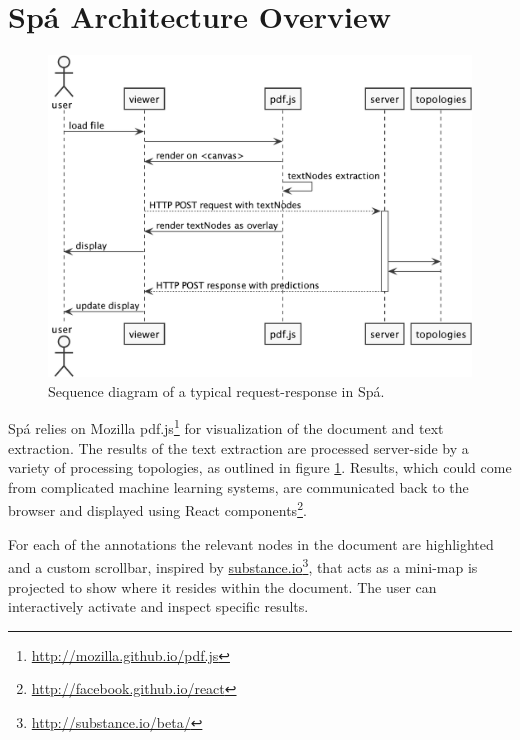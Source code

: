 \documentclass[runningheads,a4paper]{llncs}
\begin{document}
\section{Spá Architecture Overview}
\label{section:architecture}
 \vspace{-1em}
\begin{figure}
\begin{center}
\includegraphics[scale=.275]{./diagrams/sequence.pdf}
\end{center}
\caption{\label{fig:sequence}Sequence diagram of a typical request-response in Spá.}
\vspace{-2em}
\end{figure}

Spá relies on Mozilla pdf.js\footnote{\url{http://mozilla.github.io/pdf.js}} for visualization of the document and text extraction.
The results of the text extraction are processed server-side by a variety of processing topologies, as outlined in figure \ref{fig:sequence}.
Results, which could come from complicated machine learning systems, are communicated back to the browser and displayed using React components\footnote{\url{http://facebook.github.io/react}}.

For each of the annotations the relevant nodes in the document are highlighted and a custom scrollbar, inspired by \href{http://substance.io/}{substance.io}\footnote{\url{http://substance.io/beta/}}, that acts as a mini-map is projected to show where it resides within the document.
The user can interactively activate and inspect specific results.
\vspace{-1em}
\end{document}
